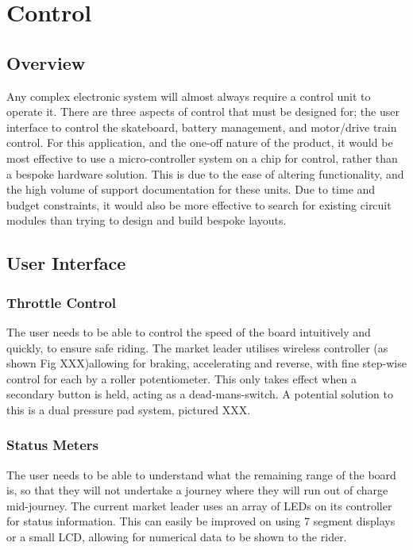 \documentclass[journal,10pt]{IEEEtran}
\begin{document}
    


\section{Control}
    \subsection{Overview}
    	Any complex electronic system will almost always require a control unit to operate it.
    	There are three aspects of control that must be designed for; the user interface to control the skateboard, battery management, and motor/drive train control.
    	For this application, and the one-off nature of the product, it would be most effective to use a micro-controller system on a chip for control, rather than a bespoke hardware solution.
    	This is due to the ease of altering functionality, and the high volume of support documentation for these units.
    	Due to time and budget constraints, it would also be more effective to search for existing circuit modules than trying to design and build bespoke layouts.
    \subsection{User Interface}
    	\subsubsection{Throttle Control}
    		The user needs to be able to control the speed of the board intuitively and quickly, to ensure safe riding.
    		The market leader utilises wireless controller (as shown Fig XXX)allowing for braking, accelerating and reverse, with fine step-wise control for each by a roller potentiometer.
    		This only takes effect when a secondary button is held, acting as a dead-mans-switch.
    		A potential solution to this is a dual pressure pad system, pictured XXX.
    	\subsubsection{Status Meters}
    		The user needs to be able to understand what the remaining range of the board is, so that they will not undertake a journey where they will run out of charge mid-journey.
    	The current market leader uses an array of LEDs on its controller for status information.
    		This can easily be improved on using 7 segment displays or a small LCD, allowing for numerical data to be shown to the rider.
\end{document}
